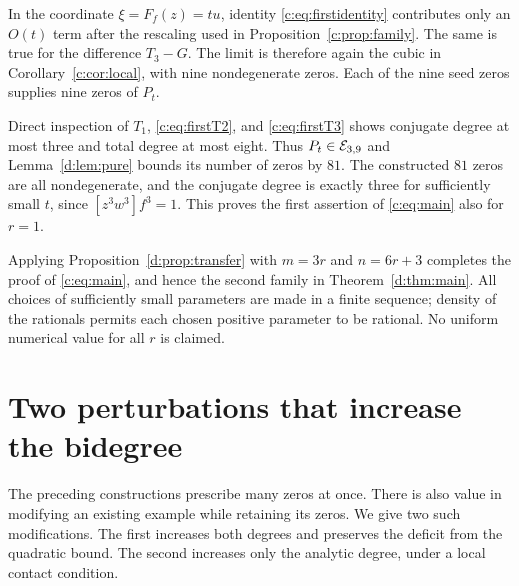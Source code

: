 \documentclass[UTF8,11pt]{ctexart}
\theoremstyle{definition}
\numberwithin{equation}{section}
\begin{document}
In the coordinate $\xi=F_f(z)=tu$, identity
\eqref{c:eq:firstidentity} contributes only an $O(t)$ term after the
rescaling used in Proposition~\ref{c:prop:family}. The same is true for
the difference $T_3-G$. The limit is therefore again the cubic in
Corollary~\ref{c:cor:local}, with nine nondegenerate zeros. Each of the
nine seed zeros supplies nine zeros of $P_t$.

Direct inspection of $T_1$, \eqref{c:eq:firstT2}, and
\eqref{c:eq:firstT3} shows conjugate degree at most three and total
degree at most eight. Thus $P_t\in\mathcal E_{3,9}$ and
Lemma~\ref{d:lem:pure} bounds its number of zeros by $81$. The constructed
$81$ zeros are all nondegenerate, and the conjugate degree is exactly
three for sufficiently small $t$, since $[z^3w^3]f^3=1$.
This proves the first assertion of \eqref{c:eq:main} also for $r=1$.


Applying Proposition~\ref{d:prop:transfer} with $m=3r$ and $n=6r+3$
completes the proof of \eqref{c:eq:main}, and hence the second family
in Theorem~\ref{d:thm:main}. All choices of sufficiently small parameters
are made in a finite sequence; density of the rationals permits each
chosen positive parameter to be rational. No uniform numerical value
for all $r$ is claimed.

\section{Two perturbations that increase the bidegree}\label{b:sec:perturbations}

The preceding constructions prescribe many zeros at once. There is also
value in modifying an existing example while retaining its zeros.
We give two such modifications. The first increases both degrees and
preserves the deficit from the quadratic bound. The second increases
only the analytic degree, under a local contact condition.
\end{document}
